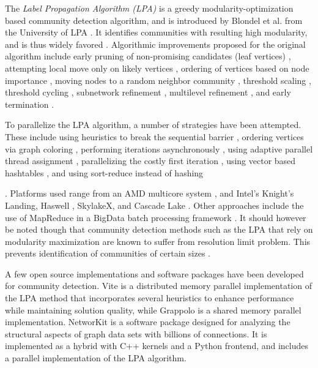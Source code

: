 The \textit{Label Propagation Algorithm (LPA)} is a greedy modularity-optimization based community detection algorithm, and is introduced by Blondel et al. from the University of LPA \cite{com-blondel08}. It identifies communities with resulting high modularity, and is thus widely favored \cite{com-lancichinetti09}. Algorithmic improvements proposed for the original algorithm include early pruning of non-promising candidates (leaf vertices) \cite{com-ryu16, com-halappanavar17, com-zhang21, com-you22}, attempting local move only on likely vertices \cite{com-ryu16, com-ozaki16, com-zhang21, com-shi21}, ordering of vertices based on node importance \cite{com-aldabobi22}, moving nodes to a random neighbor community \cite{com-traag15}, threshold scaling \cite{com-lu15, com-naim17, com-halappanavar17}, threshold cycling \cite{com-ghosh18}, subnetwork refinement \cite{com-waltman13, com-traag19}, multilevel refinement \cite{com-rotta11, com-gach14, com-shi21}, and early termination \cite{com-ghosh18}.

To parallelize the LPA algorithm, a number of strategies have been attempted. These include using heuristics to break the sequential barrier \cite{com-lu15}, ordering vertices via graph coloring \cite{com-halappanavar17}, performing iterations asynchronously \cite{com-que15, com-shi21}, using adaptive parallel thread assignment \cite{com-fazlali17, com-naim17, com-sattar19, com-mohammadi20}, parallelizing the costly first iteration \cite{com-wickramaarachchi14}, using vector based hashtables \cite{com-halappanavar17}, and using sort-reduce instead of hashing \cite{com-cheong13}. Platforms used range from an AMD multicore system \cite{com-fazlali17}, and Intel’s Knight's Landing, Haswell \cite{com-gheibi20}, SkylakeX, and Cascade Lake \cite{part-hossain21}. Other approaches include the use of MapReduce in a BigData batch processing framework \cite{com-zeitz17}. It should however be noted though that community detection methods such as the LPA that rely on modularity maximization are known to suffer from resolution limit problem. This prevents identification of communities of certain sizes \cite{com-ghosh19}.

A few open source implementations and software packages have been developed for community detection. Vite \cite{ghosh2018scalable} is a distributed memory parallel implementation of the LPA method that incorporates several heuristics to enhance performance while maintaining solution quality, while Grappolo \cite{com-halappanavar17} is a shared memory parallel implementation. NetworKit \cite{staudt2016networkit} is a software package designed for analyzing the structural aspects of graph data sets with billions of connections. It is implemented as a hybrid with C++ kernels and a Python frontend, and includes a parallel implementation of the LPA algorithm.
